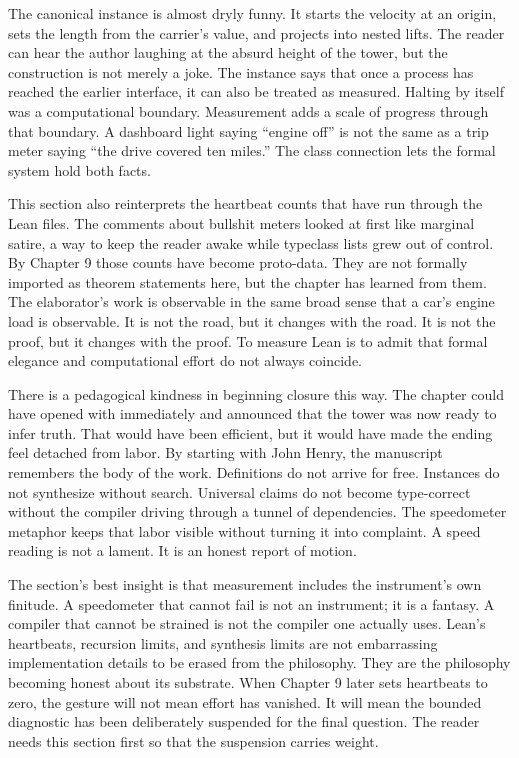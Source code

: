 The canonical instance  is almost dryly funny. It
starts the velocity at an origin, sets the length from the carrier's value,
and projects into nested lifts. The reader can hear the author laughing at the
absurd height of the tower, but the construction is not merely a joke. The
instance says that once a process has reached the earlier 
interface, it can also be treated as measured. Halting by itself was a
computational boundary. Measurement adds a scale of progress through that
boundary. A dashboard light saying ``engine off'' is not the same as a trip
meter saying ``the drive covered ten miles.'' The class connection lets the
formal system hold both facts.

This section also reinterprets the heartbeat counts that have run through the
Lean files. The comments about bullshit meters looked at first like marginal
satire, a way to keep the reader awake while typeclass lists grew out of
control. By Chapter 9 those counts have become proto-data. They are not
formally imported as theorem statements here, but the chapter has learned from
them. The elaborator's work is observable in the same broad sense that a car's
engine load is observable. It is not the road, but it changes with the road. It
is not the proof, but it changes with the proof. To measure Lean is to admit
that formal elegance and computational effort do not always coincide.

There is a pedagogical kindness in beginning closure this way. The chapter
could have opened with  immediately and announced that the tower
was now ready to infer truth. That would have been efficient, but it would
have made the ending feel detached from labor. By starting with John Henry,
the manuscript remembers the body of the work. Definitions do not arrive for
free. Instances do not synthesize without search. Universal claims do not
become type-correct without the compiler driving through a tunnel of
dependencies. The speedometer metaphor keeps that labor visible without
turning it into complaint. A speed reading is not a lament. It is an honest
report of motion.

The section's best insight is that measurement includes the instrument's own
finitude. A speedometer that cannot fail is not an instrument; it is a fantasy.
A compiler that cannot be strained is not the compiler one actually uses.
Lean's heartbeats, recursion limits, and synthesis limits are not embarrassing
implementation details to be erased from the philosophy. They are the
philosophy becoming honest about its substrate. When Chapter 9 later sets
heartbeats to zero, the gesture will not mean effort has vanished. It will
mean the bounded diagnostic has been deliberately suspended for the final
question. The reader needs this section first so that the suspension carries
weight.

